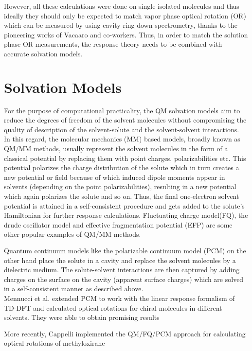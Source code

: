 However, all 
these calculations were done on single isolated molecules and thus ideally they should only be expected to match vapor phase 
optical rotation (OR) which can be measured by using cavity ring down spectrometry, thanks to the pioneering 
works of Vacaaro and co-workers.\cite{} Thus, in order to match the solution phase OR measurements, the response theory
needs to be combined with accurate solvation models. \\ 
\section{Solvation Models}
For the purpose of computational practicality, the QM solvation models aim to reduce the degrees of freedom of
the solvent molecules without compromising the quality of description of the solvent-solute and the solvent-solvent
interactions. \\
In this regard, the molecular mechanics (MM) based models, broadly known as QM/MM methods, usually represent the
solvent molecules in the form of a classical potential by replacing them with point charges, polarizabilities etc.\cite{}
This potential polarizes the charge distribution of the solute which in turn creates a new potential or field because of
which induced dipole moments appear in solvents (depending on the point polarizabilities), resulting in a new
potential which again polarizes the solute and so on. Thus, the final one-electron solvent potential is attained in a
self-consistent procedure and gets added to the solute's Hamiltonian for further response calculations. Fluctuating
charge model(FQ)\cite{}, the drude oscillator model\cite{} and effective fragmentation potential (EFP)\cite{} are some
other popular examples of QM/MM methods.

Quantum continuum models like the polarizable continuum model (PCM)\cite{}
on the other hand place the solute in a cavity and replace the solvent molecules by a dielectric medium. The
solute-solvent interactions are then captured by adding charges on the surface on the cavity (apparent surface charges)
which are solved in a self-consistent manner as described above.\\


Mennucci et al. extended PCM to work with the linear response formalism of TD-DFT\cite{Mennucci02}
and calculated optical rotations for chiral molecules in different solvents. They were able to obtain promising results

More recently, Cappelli implemented the
QM/FQ/PCM approach for calculating optical rotations of methyloxirane


